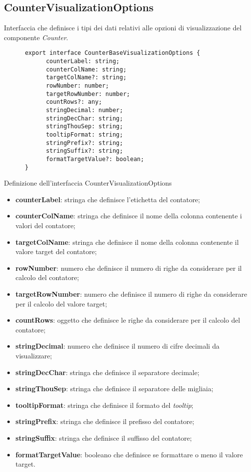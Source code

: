 \subsection{CounterVisualizationOptions}
Interfaccia che definisce i tipi dei dati relativi alle opzioni di visualizzazione del componente \textit{Counter}.
\begin{listing}[H]
      \begin{verbatim}
      export interface CounterBaseVisualizationOptions {
            counterLabel: string;
            counterColName: string;
            targetColName?: string;
            rowNumber: number;
            targetRowNumber: number;
            countRows?: any;
            stringDecimal: number;
            stringDecChar: string;
            stringThouSep: string;
            tooltipFormat: string;
            stringPrefix?: string;
            stringSuffix?: string;
            formatTargetValue?: boolean;
      }
      \end{verbatim}
      \caption{Definizione dell'interfaccia CounterVisualizationOptions}
      \label{listing:counterVisualizationOptions}
\end{listing}
\begin{itemize}
      \item \textbf{counterLabel}: stringa che definisce l'etichetta del contatore;
      \item \textbf{counterColName}: stringa che definisce il nome della colonna contenente i valori del contatore;
      \item \textbf{targetColName}: stringa che definisce il nome della colonna contenente il valore target del contatore;
      \item \textbf{rowNumber}: numero che definisce il numero di righe da considerare per il calcolo del contatore;
      \item \textbf{targetRowNumber}: numero che definisce il numero di righe da considerare per il calcolo del valore target;
      \item \textbf{countRows}: oggetto che definisce le righe da considerare per il calcolo del contatore;
      \item \textbf{stringDecimal}: numero che definisce il numero di cifre decimali da visualizzare;
      \item \textbf{stringDecChar}: stringa che definisce il separatore decimale;
      \item \textbf{stringThouSep}: stringa che definisce il separatore delle migliaia;
      \item \textbf{tooltipFormat}: stringa che definisce il formato del \textit{tooltip};
      \item \textbf{stringPrefix}: stringa che definisce il prefisso del contatore;
      \item \textbf{stringSuffix}: stringa che definisce il suffisso del contatore;
      \item \textbf{formatTargetValue}: booleano che definisce se formattare o meno il valore target.
\end{itemize}

